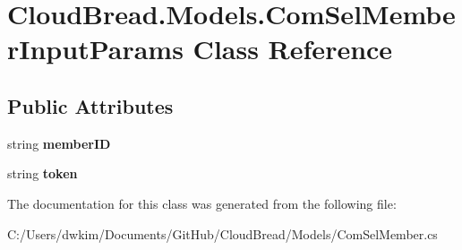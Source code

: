 \hypertarget{a00062}{}\section{Cloud\+Bread.\+Models.\+Com\+Sel\+Member\+Input\+Params Class Reference}
\label{a00062}
\subsection*{Public Attributes}
\begin{DoxyCompactItemize}
\item 
string {\bfseries member\+ID}\hypertarget{a00062_a7cc7bf8773ceee50e81517f36db14e3b}{}\label{a00062_a7cc7bf8773ceee50e81517f36db14e3b}

\item 
string {\bfseries token}\hypertarget{a00062_a1bbf7344e4853ca6bdb1516d137b6002}{}\label{a00062_a1bbf7344e4853ca6bdb1516d137b6002}

\end{DoxyCompactItemize}


The documentation for this class was generated from the following file\+:\begin{DoxyCompactItemize}
\item 
C\+:/\+Users/dwkim/\+Documents/\+Git\+Hub/\+Cloud\+Bread/\+Models/Com\+Sel\+Member.\+cs\end{DoxyCompactItemize}
